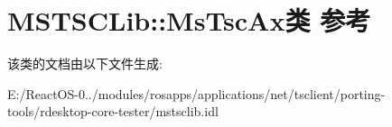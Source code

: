 \hypertarget{class_m_s_t_s_c_lib_1_1_ms_tsc_ax}{}\section{M\+S\+T\+S\+C\+Lib\+:\+:Ms\+Tsc\+Ax类 参考}
\label{class_m_s_t_s_c_lib_1_1_ms_tsc_ax}


该类的文档由以下文件生成\+:\begin{DoxyCompactItemize}
\item 
E\+:/\+React\+O\+S-\/0../modules/rosapps/applications/net/tsclient/porting-\/tools/rdesktop-\/core-\/tester/mstsclib.\+idl\end{DoxyCompactItemize}
